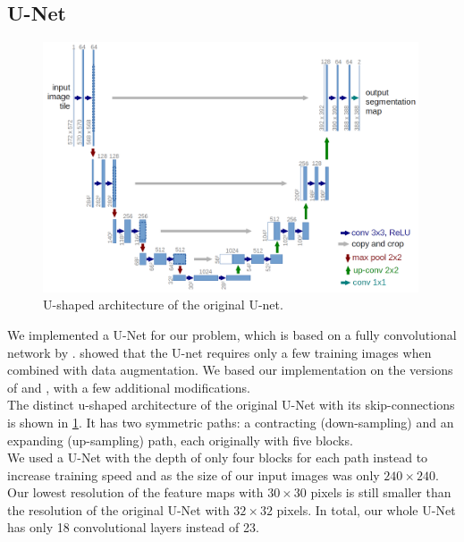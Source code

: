 \documentclass[final]{article}
\begin{document}
\subsection{U-Net}
\begin{figure}[h]
\centering
\includegraphics[width=0.99\textwidth]{u_net}
\caption{U-shaped architecture of the original U-net. \citep{ronneberger2015u}}
\label{fig:u-net}
\end{figure}
We implemented a U-Net for our problem, which is based on a fully convolutional network by \cite{Long14}. \cite{ronneberger2015u} showed that the U-net requires only a few training images when combined with data augmentation. We based our implementation on the versions of \cite{zijundeng} and \cite{jaxony}, with a few additional modifications.\\

The distinct u-shaped architecture of the original U-Net with its skip-connections is shown in \cref{fig:u-net}. It has two symmetric paths: a contracting (down-sampling) and an expanding (up-sampling) path, each originally with five blocks. \\
We used a U-Net with the depth of only four blocks for each path instead to increase training speed and as the size of our input images was only $240 \times 240$. Our lowest resolution of the feature maps with $30 \times 30$ pixels is still smaller than the resolution of the original U-Net with $32 \times 32$ pixels. 
In total, our whole U-Net has only 18 convolutional layers instead of 23.\\
\end{document}
